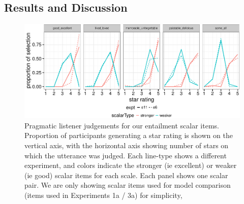 \documentclass[10pt, letterpaper]{article}
\newenvironment{CodeChunk}{}{}
\begin{document}
\subsection{Results and Discussion}\label{results-and-discussion-1}

\begin{CodeChunk}
\begin{figure}[t]

{\centering \includegraphics{figs/exp2Plots-1} 

}

\caption[Pragmatic listener judgements for our entailment scalar items]{Pragmatic listener judgements for our entailment scalar items. Proportion of participants generating a star rating is shown on the vertical axis, with the horizontal axis showing number of stars on which the utterance was judged. Each line-type shows a different experiment, and colors indicate the stronger (ie excellent) or weaker (ie good) scalar items for each scale. Each panel shows one scalar pair. We are only showing scalar items used for model comparison (items used in Experiments 1a / 3a) for simplicity,}\label{fig:exp2Plots}
\end{figure}
\end{CodeChunk}
\end{document}

